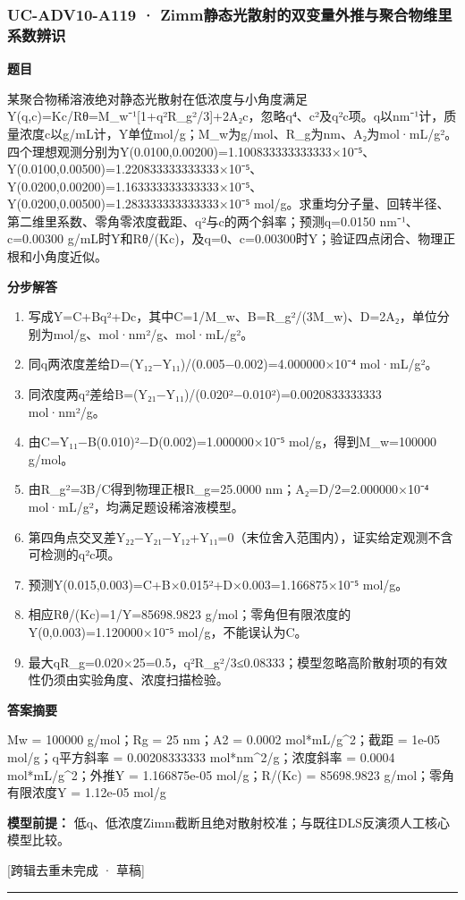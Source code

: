 \documentclass[UTF8,11pt,a4paper]{ctexart}
\begin{document}
\subsubsection*{UC-ADV10-A119 · Zimm静态光散射的双变量外推与聚合物维里系数辨识}
\noindent\textbf{题目}\par
某聚合物稀溶液绝对静态光散射在低浓度与小角度满足Y(q,c)=Kc/Rθ=M\_w⁻¹[1+q²R\_g²/3]+2A₂c，忽略q⁴、c²及q²c项。q以nm⁻¹计，质量浓度c以g/mL计，Y单位mol/g；M\_w为g/mol、R\_g为nm、A₂为mol·mL/g²。四个理想观测分别为Y(0.0100,0.00200)=1.100833333333333×10⁻⁵、Y(0.0100,0.00500)=1.220833333333333×10⁻⁵、Y(0.0200,0.00200)=1.163333333333333×10⁻⁵、Y(0.0200,0.00500)=1.283333333333333×10⁻⁵ mol/g。求重均分子量、回转半径、第二维里系数、零角零浓度截距、q²与c的两个斜率；预测q=0.0150 nm⁻¹、c=0.00300 g/mL时Y和Rθ/(Kc)，及q=0、c=0.00300时Y；验证四点闭合、物理正根和小角度近似。\par
\medskip\noindent\textbf{分步解答}
\begin{enumerate}
\item 写成Y=C+Bq²+Dc，其中C=1/M\_w、B=R\_g²/(3M\_w)、D=2A₂，单位分别为mol/g、mol·nm²/g、mol·mL/g²。
\item 同q两浓度差给D=(Y₁₂−Y₁₁)/(0.005−0.002)=4.000000×10⁻⁴ mol·mL/g²。
\item 同浓度两q²差给B=(Y₂₁−Y₁₁)/(0.020²−0.010²)=0.0020833333333 mol·nm²/g。
\item 由C=Y₁₁−B(0.010)²−D(0.002)=1.000000×10⁻⁵ mol/g，得到M\_w=100000 g/mol。
\item 由R\_g²=3B/C得到物理正根R\_g=25.0000 nm；A₂=D/2=2.000000×10⁻⁴ mol·mL/g²，均满足题设稀溶液模型。
\item 第四角点交叉差Y₂₂−Y₂₁−Y₁₂+Y₁₁=0（末位舍入范围内），证实给定观测不含可检测的q²c项。
\item 预测Y(0.015,0.003)=C+B×0.015²+D×0.003=1.166875×10⁻⁵ mol/g。
\item 相应Rθ/(Kc)=1/Y=85698.9823 g/mol；零角但有限浓度的Y(0,0.003)=1.120000×10⁻⁵ mol/g，不能误认为C。
\item 最大qR\_g=0.020×25=0.5，q²R\_g²/3≤0.08333；模型忽略高阶散射项的有效性仍须由实验角度、浓度扫描检验。
\end{enumerate}
\noindent\textbf{答案摘要}\par
Mw = 100000 g/mol；Rg = 25 nm；A2 = 0.0002 mol*mL/g\textasciicircum{}2；截距 = 1e-05 mol/g；q平方斜率 = 0.00208333333 mol*nm\textasciicircum{}2/g；浓度斜率 = 0.0004 mol*mL/g\textasciicircum{}2；外推Y = 1.166875e-05 mol/g；R/(Kc) = 85698.9823 g/mol；零角有限浓度Y = 1.12e-05 mol/g\par
\noindent\textbf{模型前提：}
低q、低浓度Zimm截断且绝对散射校准；与既往DLS反演须人工核心模型比较。\par
\noindent\textcolor{red!65!black}{[跨辑去重未完成 · 草稿]} \par
\medskip\hrule\medskip
{}
\end{document}
